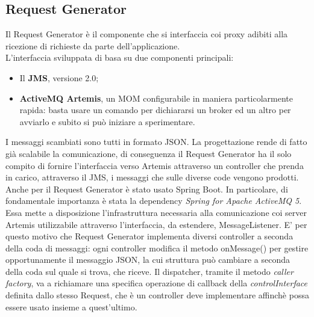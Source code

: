 \subsection{Request Generator}
Il Request Generator è il componente che si interfaccia coi proxy adibiti alla ricezione di richieste da parte dell'applicazione. 
\\L'interfaccia sviluppata di basa su due componenti principali: 
\begin{itemize}
	\item Il \textbf{JMS}, versione 2.0;
	\item \textbf{ActiveMQ Artemis}, un MOM configurabile in maniera particolarmente rapida: basta usare un comando per dichiararsi un broker ed un altro per avviarlo e subito si può iniziare a sperimentare.
\end{itemize}
I messaggi scambiati sono tutti in formato JSON. La progettazione rende di fatto già scalabile la comunicazione, di conseguenza il Request Generator ha il solo compito di fornire l'interfaccia verso Artemis attraverso un controller che prenda in carico, attraverso il JMS, i messaggi che sulle diverse code vengono prodotti. \vspace{0.5cm}
\\Anche per il Request Generator è stato usato Spring Boot. In particolare, di fondamentale importanza è stata la dependency \textit{Spring for Apache ActiveMQ 5}. Essa mette a disposizione l'infrastruttura necessaria alla comunicazione coi server Artemis utilizzabile attraverso l'interfaccia, da estendere, MessageListener. E' per questo motivo che Request Generator implementa diversi controller a seconda della coda di messaggi: ogni controller modifica il metodo onMessage() per gestire opportunamente il messaggio JSON, la cui struttura può cambiare a seconda della coda sul quale si trova, che riceve. Il dispatcher, tramite il metodo \textit{caller factory}, va a  richiamare una specifica operazione di callback della \textit{controlInterface} definita dallo stesso Request, che è un controller deve implementare affinchè possa essere usato insieme a quest'ultimo.  


